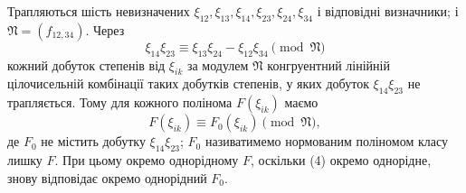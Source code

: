\documentclass[11pt]{article}
\providecommand{\frN}{\mathfrak N}
\begin{document}
Трапляються шість невизначених \(\xi_{12},\xi_{13},\xi_{14},\xi_{23},\xi_{24},\xi_{34}\) і відповідні визначники; і \(\frN=(f_{12,34})\). Через
\begin{equation}
        \xi_{14}\xi_{23}\equiv \xi_{13}\xi_{24}-\xi_{12}\xi_{34}\pmod{\frN}
\end{equation}
кожний добуток степенів від \(\xi_{ik}\) за модулем \(\frN\) конгруентний лінійній цілочисельній комбінації таких добутків степенів, у яких добуток \(\xi_{14}\xi_{23}\) не трапляється. Тому для кожного полінома \(F(\xi_{ik})\) маємо
\begin{equation}
        F(\xi_{ik})\equiv F_0(\xi_{ik})\pmod{\frN},
\end{equation}
де \(F_0\) не містить добутку \(\xi_{14}\xi_{23}\); \(F_0\) називатимемо нормованим поліномом класу лишку \(F\). При цьому окремо однорідному \(F\), оскільки (4) окремо однорідне, знову відповідає окремо однорідний \(F_0\).
\end{document}
